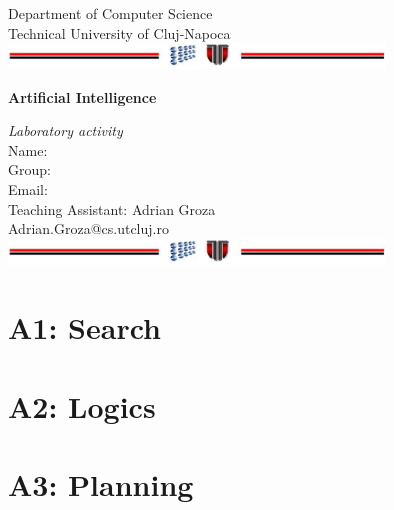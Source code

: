 \documentclass[a4paper,12pt]{report}
\begin{document}
\vspace{-5cm}
\begin{center}
Department of Computer Science\\
Technical University of Cluj-Napoca\\
\includegraphics[width=10cm]{fig/footer}
\end{center}
\vspace{1cm}
\begin{center}
\begin{Large}
 \textbf{Artificial Intelligence}\\
\end{Large}
\textit{Laboratory activity}\\
\vspace{3cm}
Name:\\
Group:\\
Email:\\
\vspace{12cm}
Teaching Assistant: Adrian Groza\\
Adrian.Groza@cs.utcluj.ro\\
\vspace{1cm}
\includegraphics[width=10cm]{fig/footer}
\end{center}

\tableofcontents




\chapter{A1: Search}


\chapter{A2: Logics}


\chapter{A3: Planning}
\end{document}
